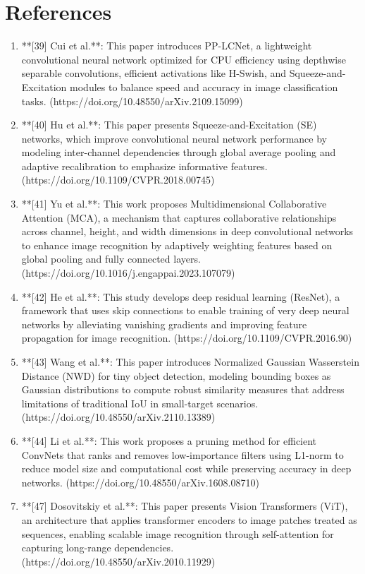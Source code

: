 \documentclass{article}
\begin{document}
\section*{References}
\begin{enumerate}
   \item **[39] Cui et al.**: This paper introduces PP-LCNet, a lightweight convolutional neural network optimized for CPU efficiency using depthwise separable convolutions, efficient activations like H-Swish, and Squeeze-and-Excitation modules to balance speed and accuracy in image classification tasks. (https://doi.org/10.48550/arXiv.2109.15099)
   \item **[40] Hu et al.**: This paper presents Squeeze-and-Excitation (SE) networks, which improve convolutional neural network performance by modeling inter-channel dependencies through global average pooling and adaptive recalibration to emphasize informative features. (https://doi.org/10.1109/CVPR.2018.00745)
   \item **[41] Yu et al.**: This work proposes Multidimensional Collaborative Attention (MCA), a mechanism that captures collaborative relationships across channel, height, and width dimensions in deep convolutional networks to enhance image recognition by adaptively weighting features based on global pooling and fully connected layers. (https://doi.org/10.1016/j.engappai.2023.107079)
   \item **[42] He et al.**: This study develops deep residual learning (ResNet), a framework that uses skip connections to enable training of very deep neural networks by alleviating vanishing gradients and improving feature propagation for image recognition. (https://doi.org/10.1109/CVPR.2016.90)
   \item **[43] Wang et al.**: This paper introduces Normalized Gaussian Wasserstein Distance (NWD) for tiny object detection, modeling bounding boxes as Gaussian distributions to compute robust similarity measures that address limitations of traditional IoU in small-target scenarios. (https://doi.org/10.48550/arXiv.2110.13389)
   \item **[44] Li et al.**: This work proposes a pruning method for efficient ConvNets that ranks and removes low-importance filters using L1-norm to reduce model size and computational cost while preserving accuracy in deep networks. (https://doi.org/10.48550/arXiv.1608.08710)
   \item **[47] Dosovitskiy et al.**: This paper presents Vision Transformers (ViT), an architecture that applies transformer encoders to image patches treated as sequences, enabling scalable image recognition through self-attention for capturing long-range dependencies. (https://doi.org/10.48550/arXiv.2010.11929)
\end{enumerate}
\end{document}
